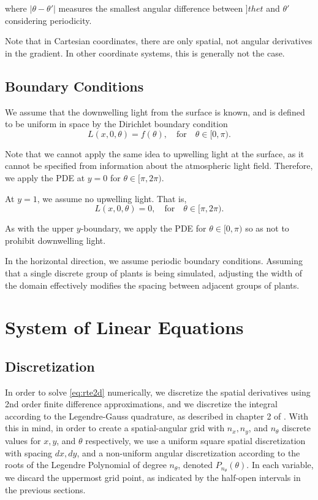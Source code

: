 \documentclass[10pt]{article}
\newcommand\abs[1]{\left| #1 \right|}
\begin{document}
\begin{multicols}{2}
where $\abs{\theta-\theta'}$ measures the smallest angular difference between $]thet$ and $\theta'$ considering periodicity.

Note that in Cartesian coordinates, there are only spatial, not angular derivatives in the gradient.
In other coordinate systems, this is generally not the case.
	
\subsection{Boundary Conditions}
We assume that the downwelling light from the surface is known, and is defined to be uniform in space by the Dirichlet boundary condition 
\begin{equation}
	L(x,0,\theta) = f(\theta), \quad \mbox{for} \quad \theta \in [0,\pi).
	\label{eq:surf_bc}
\end{equation}

Note that we cannot apply the same idea to upwelling light at the surface, as it cannot be specified from information about the atmospheric light field.
Therefore, we apply the PDE at $y=0$ for $\theta \in [\pi,2\pi)$.

At $y=1$, we assume no upwelling light.
That is,
\begin{equation}
	L(x,0,\theta) = 0, \quad \mbox{for} \quad \theta \in [\pi,2\pi).
	\label{eq:bottom_bc}
\end{equation}

As with the upper $y$-boundary, we apply the PDE for $\theta \in [0,\pi)$ so as not to prohibit downwelling light.

In the horizontal direction, we assume periodic boundary conditions.
Assuming that a single discrete group of plants is being simulated, adjusting the width of the domain effectively modifies the spacing between adjacent groups of plants.

\section{System of Linear Equations}

\subsection{Discretization}
In order to solve \eqref{eq:rte2d} numerically, we discretize the spatial derivatives using 2nd order finite difference approximations, and we discretize the integral according to the Legendre-Gauss quadrature, as described in chapter 2 of \citet{chandrasekhar_radiative_1960}.
With this in mind, in order to create a spatial-angular grid with $n_x,n_y$, and $n_\theta$ discrete values for $x, y$, and $\theta$ respectively, we use a uniform square spatial discretization with spacing $dx, dy$, and a non-uniform angular discretization according to the roots of the Legendre Polynomial of degree $n_\theta$, denoted $P_{n_\theta}(\theta)$.
In each variable, we discard the uppermost grid point, as indicated by the half-open intervals in the previous sections.


\end{multicols}
\end{document}
